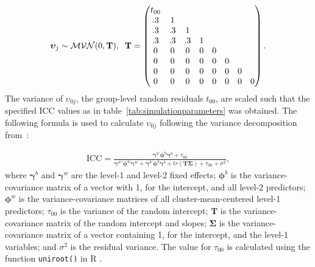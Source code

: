 \documentclass[10pt, a4paper, titlepage]{article}
\begin{document}
\begin{subequations} 
\begin{align}
    \boldsymbol{\upsilon}_{j} \sim \mathcal{MVN}(0, \mathbf{T}), \hspace{.2cm}
    \mathbf{T} = \begin{pmatrix}
        t_{00}& & & & & & \\
          .3& 1& & & & & \\
          .3& .3& 1& & & & \\
          .3& .3& .3& 1& & & \\
          0& 0& 0& 0& 0& & \\
          0& 0& 0& 0& 0& 0& \\
          0& 0& 0& 0& 0& 0& 0 \\
          0& 0& 0& 0& 0& 0& 0& 0
    \end{pmatrix} \label{eq:T}.
\end{align}
\end{subequations}
The variance of $\upsilon_{0j}$, the group-level random residuals $t_{00}$, are scaled such that the specified ICC values as in table~\ref{tab:simulationparameters} was obtained. The following formula is used to calculate $\upsilon_{0j}$ following the variance decomposition from~\cite{rights2019}:

\begin{align}
\label{eq:variancedecomposition}
\text{ICC} = \frac{\boldsymbol{\gamma}^{b'}\boldsymbol{\phi}^{b}\boldsymbol{\gamma}^{b} + \tau_{00}}{\boldsymbol{\gamma}^{w'}\boldsymbol{\phi}^{w}\boldsymbol{\gamma}^{w} + \boldsymbol{\gamma}^{b'}\boldsymbol{\phi}^{b}\boldsymbol{\gamma}^{b} + tr(\mathbf{T}\boldsymbol{\Sigma})+ \tau_{00} + \sigma^{2}},
\end{align} where $\boldsymbol{\gamma}^{b}$ and $\boldsymbol{\gamma}^{w}$ are the level-1 and level-2 fixed effects; $\boldsymbol{\phi}^{b}$ is the variance-covariance matrix of a vector with 1, for the intercept, and all level-2 predictors; $\boldsymbol{\phi}^{w}$ is the variance-covariance matrices of all cluster-mean-centered level-1 predictors; $\tau_{00}$ is the variance of the random intercept; $\mathbf{T}$ is the variance-covariance matrix of the random intercept and slopes; $\boldsymbol{\Sigma}$ is the variance-covariance matrix of a vector containing 1, for the intercept, and the level-1 variables; and $\sigma^{2}$ is the residual variance. The value for $\tau_{00}$ is calculated using the function \texttt{uniroot()} in R \citep{rcoreteam2023}.
\end{document}
